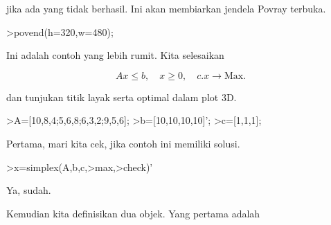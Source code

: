 \documentclass[a4paper,10pt]{article}
\begin{document}
\begin{eulernotebook}
\begin{eulercomment}
\begin{eulercomment}
\begin{eulercomment}
jika ada yang tidak berhasil. Ini akan membiarkan jendela Povray
terbuka.
\end{eulercomment}
\begin{eulerprompt}
>povend(h=320,w=480);
\end{eulerprompt}
\begin{eulercomment}
Ini adalah contoh yang lebih rumit. Kita selesaikan

\end{eulercomment}
\begin{eulerformula}
\[
Ax \le b, \quad x \ge 0, \quad c.x \to \text{Max.}
\]
\end{eulerformula}
\begin{eulercomment}
dan tunjukan titik layak serta optimal dalam plot 3D.
\end{eulercomment}
\begin{eulerprompt}
>A=[10,8,4;5,6,8;6,3,2;9,5,6];
>b=[10,10,10,10]';
>c=[1,1,1];
\end{eulerprompt}
\begin{eulercomment}
Pertama, mari kita cek, jika contoh ini memiliki solusi.
\end{eulercomment}
\begin{eulerprompt}
>x=simplex(A,b,c,>max,>check)'
\end{eulerprompt}
\begin{euleroutput}
  [0,  1,  0.5]
\end{euleroutput}
\begin{eulercomment}
Ya, sudah.

Kemudian kita definisikan dua objek. Yang pertama adalah


\end{eulercomment}
\end{eulercomment}
\end{eulercomment}
\end{eulernotebook}
\end{document}
